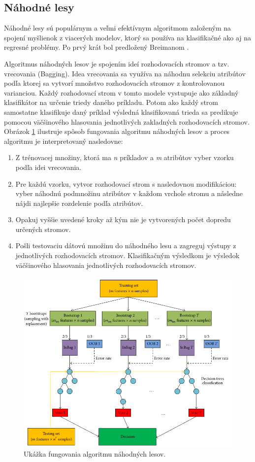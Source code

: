 \subsection{Náhodné lesy}
Náhodné lesy sú populárnym a veľmi efektívnym algoritmom založeným na spojení myšlienok z viacerých modelov, ktorý sa používa na klasifikačné ako aj na regresné problémy. Po prvý krát bol predložený Breimanom \cite{8}.\par
Algoritmus náhodných lesov je spojením ideí rozhodovacích stromov a tzv. vrecovania (Bagging). Idea vrecovania sa využíva na náhodnu selekciu atribútov podľa ktorej sa vytvorí množstvo rozhodovacích stromov z kontrolovanou varianciou. Každý rozhodovací strom v tomto modele vystupuje ako základný klasifikátor na určenie triedy daného príkladu. Potom ako každý strom samostatne klasifikuje daný príklad výsledná klasifikovaná trieda sa predikuje pomocou väčšinového hlasovania jednotlivých zakladných rozhodovacích stromov.
Obrázok \ref{img:rf_workflow} ilustruje spôsob fungovania algoritmu náhodných lesov a proces algoritmu je interpretovaný nasledovne:
\begin{enumerate}
  \item Z trénovacej množiny, ktorá ma \textit{n} príkladov a \textit{m} atribútov vyber vzorku podľa idei vrecovania.
  \item Pre každú vzorku, vytvor rozhodovací strom s nasledovnou modifikáciou: vyber náhodnú podmnožinu atribútov v každom vrchole stromu a následne nájdi najlepšie rozdelenie podľa atribútov.
  \item Opakuj vyššie uvedené kroky až kým nie je vytvorených počet dopredu určených stromov.
  \item Pošli testovaciu dátovú množinu do náhodného lesu a zagreguj výstupy z jednotlivých rozhodovacích stromov. Klasifikačným výsledkom je výsledok väčšinového hlasovania jednotlivých rozhodovacích stromov.
\end{enumerate}
\begin{figure}[H]
	\begin{center}
		\includegraphics[scale=0.6]{img/rf_workflow.png}
		\caption{Ukážka fungovania algoritmu náhodných lesov.}
		\label{img:rf_workflow}
	\end{center}
\end{figure}
